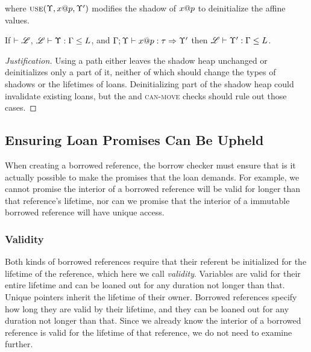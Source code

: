 

where $\textsc{use}(\Upsilon,{x}@{p},\Upsilon')$ modifies the shadow 
of ${x}@{p}$ to deinitialize the affine values.

\begin{conj}
  If $\vdash\mathscr{L}$, ${\mathscr{L}} \vdash {\Upsilon} : {\Gamma} \leq {L}$, and ${\Gamma};{\Upsilon}\vdash{{x}@{p}}:{\tau}\Rightarrow{\Upsilon'}$
  then ${\mathscr{L}} \vdash {\Upsilon'} : {\Gamma} \leq {L}$.
\end{conj}

\begin{proof}[Justification]
  Using a path either leaves the shadow heap unchanged or deinitializes only a part of it,
  neither of which should change the types of shadows or the lifetimes of loans.
  Deinitializing part of the shadow heap could invalidate existing loans,
  but the  and \textsc{can-move} checks should rule out those cases.
\end{proof}

\subsection*{Ensuring Loan Promises Can Be Upheld}
When creating a borrowed reference, the borrow checker must ensure
that is it actually possible to make the promises that the loan demands.
For example, we cannot promise the interior of a borrowed reference will be 
valid for longer than that reference's lifetime, nor can we promise that
the interior of a immutable borrowed reference will have unique access.

\subsubsection*{Validity}
Both kinds of borrowed references require that their referent be initialized for
the lifetime of the reference, which here we call \emph{validity}.
Variables are valid for their entire lifetime and can be loaned out for any duration
not longer than that.
Unique pointers inherit the lifetime of their owner.
Borrowed references specify how long they are valid by their lifetime, and they
can be loaned out for any duration not longer than that. Since we already know
the interior of a borrowed reference is valid for the lifetime of that reference,
we do not need to examine further.
\newline

